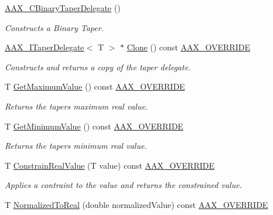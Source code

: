\begin{DoxyCompactItemize}
\item 
\mbox{\hyperlink{a01457_aae24e1f477f843ddb351838931a3e6b5}{A\+A\+X\+\_\+\+C\+Binary\+Taper\+Delegate}} ()
\begin{DoxyCompactList}\small\item\em Constructs a Binary Taper. \end{DoxyCompactList}\item 
\mbox{\hyperlink{a01881}{A\+A\+X\+\_\+\+I\+Taper\+Delegate}}$<$ T $>$ $\ast$ \mbox{\hyperlink{a01457_a433b33f4b290fe03846b2044014ae994}{Clone}} () const \mbox{\hyperlink{a00392_ac2f24a5172689ae684344abdcce55463}{A\+A\+X\+\_\+\+O\+V\+E\+R\+R\+I\+DE}}
\begin{DoxyCompactList}\small\item\em Constructs and returns a copy of the taper delegate. \end{DoxyCompactList}\item 
T \mbox{\hyperlink{a01457_a1abc18860a0c404676c52d8d1d8b7724}{Get\+Maximum\+Value}} () const \mbox{\hyperlink{a00392_ac2f24a5172689ae684344abdcce55463}{A\+A\+X\+\_\+\+O\+V\+E\+R\+R\+I\+DE}}
\begin{DoxyCompactList}\small\item\em Returns the taper\textquotesingle{}s maximum real value. \end{DoxyCompactList}\item 
T \mbox{\hyperlink{a01457_af4c360e6bef8fc945d838715c5f965c7}{Get\+Minimum\+Value}} () const \mbox{\hyperlink{a00392_ac2f24a5172689ae684344abdcce55463}{A\+A\+X\+\_\+\+O\+V\+E\+R\+R\+I\+DE}}
\begin{DoxyCompactList}\small\item\em Returns the taper\textquotesingle{}s minimum real value. \end{DoxyCompactList}\item 
T \mbox{\hyperlink{a01457_a91622c9c4cfaaf3b08e39095a26d182a}{Constrain\+Real\+Value}} (T value) const \mbox{\hyperlink{a00392_ac2f24a5172689ae684344abdcce55463}{A\+A\+X\+\_\+\+O\+V\+E\+R\+R\+I\+DE}}
\begin{DoxyCompactList}\small\item\em Applies a contraint to the value and returns the constrained value. \end{DoxyCompactList}\item 
T \mbox{\hyperlink{a01457_ac50e2d93aeacf6a0293eb0098c8258ba}{Normalized\+To\+Real}} (double normalized\+Value) const \mbox{\hyperlink{a00392_ac2f24a5172689ae684344abdcce55463}{A\+A\+X\+\_\+\+O\+V\+E\+R\+R\+I\+DE}}

\end{DoxyCompactItemize}
